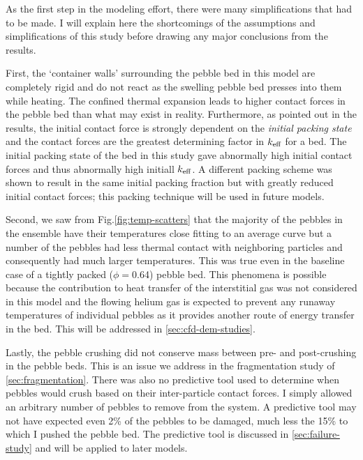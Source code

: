 As the first step in the modeling effort, there were many simplifications that had to be made. I will explain here the shortcomings of the assumptions and simplifications of this study before drawing any major conclusions from the results.

First, the `container walls' surrounding the pebble bed in this model are completely rigid and do not react as the swelling pebble bed presses into them while heating. The confined thermal expansion leads to higher contact forces in the pebble bed than what may exist in reality. Furthermore, as pointed out in the results, the initial contact force is strongly dependent on the \textit{initial packing state} and the contact forces are the greatest determining factor in $k_\text{eff}$ for a bed. The initial packing state of the bed in this study gave abnormally high initial contact forces and thus abnormally high initiall $k_\text{eff}$. A different packing scheme was shown to result in the same initial packing fraction but with greatly reduced initial contact forces; this packing technique will be used in future models. 

Second, we saw from Fig.\ref{fig:temp-scatters} that the majority of the pebbles in the ensemble have their temperatures close fitting to an average curve but a number of the pebbles had less thermal contact with neighboring particles and consequently had much larger temperatures. This was true even in the baseline case of a tightly packed ($\phi =$\num{0.64}) pebble bed. This phenomena is possible because the contribution to heat transfer of the interstitial gas was not considered in this model and the flowing helium gas is expected to prevent any runaway temperatures of individual pebbles as it provides another route of energy transfer in the bed. This will be addressed in \cref{sec:cfd-dem-studies}.

Lastly, the pebble crushing did not conserve mass between pre- and post-crushing in the pebble beds. This is an issue we address in the fragmentation study of \cref{sec:fragmentation}. There was also no predictive tool used to determine when pebbles would crush based on their inter-particle contact forces. I simply allowed an arbitrary number of pebbles to remove from the system. A predictive tool may not have expected even 2\% of the pebbles to be damaged, much less the 15\% to which I pushed the pebble bed. The predictive tool is discussed in \cref{sec:failure-study} and will be applied to later models.

